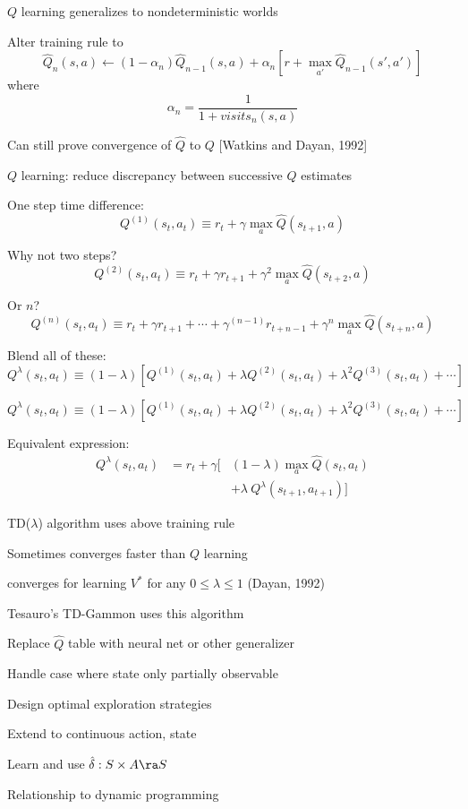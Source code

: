 $Q$ learning generalizes to nondeterministic worlds
\bigskip

Alter training rule to
\[ \hat{Q}_{n}(s,a)  \leftarrow  (1-\alpha_{n})\hat{Q}_{n-1}(s,a) + \alpha_{n}[r
+ \max_{a'}\hat{Q}_{n-1}(s',a')] \]
where
\[ \alpha_{n} = \frac{1}{1 + visits_n(s,a)} \]

\bigskip

\bigskip

Can still prove convergence of $\hat{Q}$ to $Q$ [Watkins and Dayan, 1992]


 \bk

$Q$ learning: reduce discrepancy between successive $Q$ estimates

\bigskip
One step time difference:
\[ Q^{(1)}(s_t,a_t) \equiv r_t + \gamma \max_{a} \hat{Q}(s_{t+1},a) \]

Why not two steps?
\[ Q^{(2)}(s_t,a_t) \equiv r_t + \gamma r_{t+1} + \gamma^2 \max_{a}
\hat{Q}(s_{t+2},a) \]

Or $n$?
\[ Q^{(n)}(s_t,a_t) \equiv r_t + \gamma r_{t+1} + \cdots
+ \gamma^{(n-1)}r_{t+n-1} + \gamma^n \max_{a}\hat{Q}(s_{t+n},a) \]

\bigskip
Blend all of these:
\[Q^{\lambda}(s_{t},a_{t})  \equiv (1- \lambda) \left[
Q^{(1)}(s_t,a_t) + \lambda Q^{(2)}(s_t,a_t) + \lambda^2 Q^{(3)}(s_t,a_t) +
\cdots \right] \]

 \bk
\[Q^{\lambda}(s_{t},a_{t})  \equiv (1- \lambda) \left[
Q^{(1)}(s_t,a_t) + \lambda Q^{(2)}(s_t,a_t) + \lambda^2 Q^{(3)}(s_t,a_t) +
\cdots \right] \]

Equivalent expression:
\begin{eqnarray*}
 Q^{\lambda}(s_{t},a_{t}) & = r_{t} + \gamma [ & (1 -
\lambda)
\max_{a}\hat{Q}(s_{t},a_{t}) \\
 & & + \lambda \ Q^{\lambda}(s_{t+1},a_{t+1})]
\end{eqnarray*}


TD($\lambda$) algorithm uses above training rule
\bi
\item Sometimes converges faster than $Q$ learning
\item converges for learning $V^*$ for any $0 \leq
\lambda \leq 1$ (Dayan, 1992)
\item Tesauro's TD-Gammon uses this algorithm
\ei
 \bk

\bi
\item
Replace $\hat{Q}$ table with neural net or other generalizer
\item
Handle case where state only partially observable
\item
Design optimal exploration strategies
\item
Extend to continuous action, state
\item
Learn and use $\hat{\delta}: S \times A \ra S$
\item 
Relationship to dynamic programming
\ei
